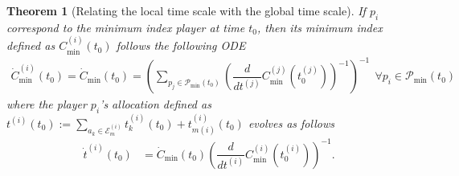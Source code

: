 \documentclass{article}
\newtheorem{theorem}{Theorem}
\begin{document}
\begin{theorem}[Relating the local time scale with the global time scale]
\label{thm:onesidedlocalglobal}
    If $p_i$ correspond to the minimum index player at time $t_0$, then its minimum index defined as $C^{(i)}_{\min}(t_0)$ follows the following ODE 
    \begin{align*}
 \dot{C}^{(i)}_{\min}(t_0)  = \dot{C}_{\min}(t_0)= \left({\sum_{p_j\in\mathcal{P}_{\min}(t_0)}\left(\dfrac{d}{dt^{(j)}}C^{(j)}_{\min}(t_0^{(j)})\right)^{-1}}\right)^{-1}\ \ \forall p_i\in\mathcal{P}_{\min}(t_0)
\end{align*}
where the player $p_i$'s allocation defined as $t^{(i)}(t_0):=\sum_{a_k\in\mathcal{E}^{(i)}_m}t^{(i)}_k(t_0)+t^{(i)}_{m(i)}(t_0)$ evolves as follows
\begin{align*}
    \dot{t}^{(i)}(t_0) &= 
    \dot{C}_{\min}(t_0)\left(\dfrac{d}{dt^{(i)}}C^{(i)}_{\min}(t_0^{(i)})\right)^{-1}.
\end{align*}


\end{theorem}
\end{document}
